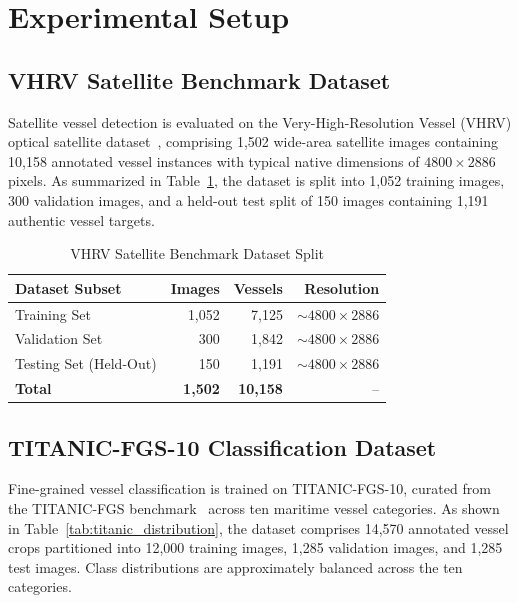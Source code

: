 \documentclass[conference]{IEEEtran}
\begin{document}
\section{Experimental Setup}

\subsection{VHRV Satellite Benchmark Dataset}
Satellite vessel detection is evaluated on the Very-High-Resolution Vessel (VHRV) optical satellite dataset~\cite{kizilkaya2025}, comprising 1,502 wide-area satellite images containing 10,158 annotated vessel instances with typical native dimensions of $4800\times2886$ pixels. As summarized in Table~\ref{tab:vhrv_distribution}, the dataset is split into 1,052 training images, 300 validation images, and a held-out test split of 150 images containing 1,191 authentic vessel targets.

\begin{table}[htbp]
\centering
\caption{VHRV Satellite Benchmark Dataset Split}
\label{tab:vhrv_distribution}
\begin{tabular}{lrrr}
\toprule
\textbf{Dataset Subset} & \textbf{Images} & \textbf{Vessels} & \textbf{Resolution} \\
\midrule
Training Set   & 1,052 & 7,125 & $\sim 4800 \times 2886$ \\
Validation Set &   300 & 1,842 & $\sim 4800 \times 2886$ \\
Testing Set (Held-Out) & 150 & 1,191 & $\sim 4800 \times 2886$ \\
\midrule
\textbf{Total} & \textbf{1,502} & \textbf{10,158} & -- \\
\bottomrule
\end{tabular}
\end{table}

\subsection{TITANIC-FGS-10 Classification Dataset}
Fine-grained vessel classification is trained on TITANIC-FGS-10, curated from the TITANIC-FGS benchmark~\cite{guo2026} across ten maritime vessel categories. As shown in Table~\ref{tab:titanic_distribution}, the dataset comprises 14,570 annotated vessel crops partitioned into 12,000 training images, 1,285 validation images, and 1,285 test images. Class distributions are approximately balanced across the ten categories.
\end{document}
